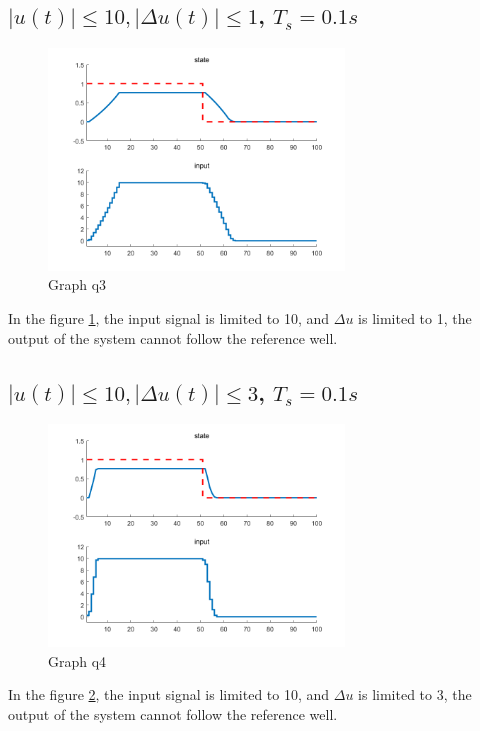 \documentclass{article}
\begin{document}
\subsection{$\left| u(t)\right| \leq 10, \left| \Delta u(t) \right| \leq 1$, $T_s=0.1s$}
\begin{figure}[h!]
    \centering
    \includegraphics[width=0.7\textwidth]{pb1 2.png}
    \caption{Graph q3}\label{fig:pb2graph3}
\end{figure}
In the figure \ref{fig:pb2graph3}, the input signal is limited to 10,
and $\Delta u$ is limited to 1, the output of the system cannot follow
the reference well.

\subsection{$\left| u(t)\right| \leq 10, \left| \Delta u(t) \right| \leq 3$, $T_s=0.1s$}

\begin{figure}[h!]
    \centering
    \includegraphics[width=0.7\textwidth]{pb1 3.png}
    \caption{Graph q4}\label{fig:pb2graph4}
\end{figure}
In the figure \ref{fig:pb2graph4}, the input signal is limited to 10,
and $\Delta u$ is limited to 3, the output of the system cannot follow
the reference well.
\end{document}
